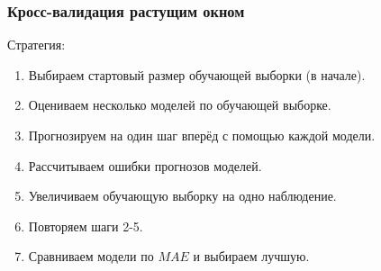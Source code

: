 \begin{frame}
    \frametitle{Кросс-валидация растущим окном}

    Стратегия:
    \begin{enumerate}
        \item Выбираем стартовый размер обучающей выборки (в начале).
        \item Оцениваем несколько моделей по обучающей выборке.
        \item Прогнозируем на один шаг вперёд с помощью каждой модели. 
        \item Рассчитываем ошибки прогнозов моделей.  
        \item \alert{Увеличиваем} обучающую выборку на одно наблюдение. 
        \item Повторяем шаги 2-5.
        \item Сравниваем модели по $MAE$ и выбираем лучшую.
    \end{enumerate}

\end{frame}


